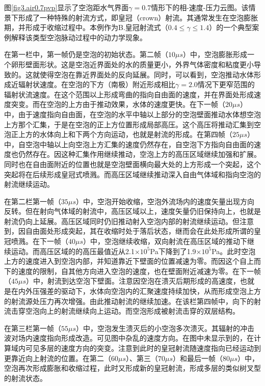 图\ref{fig3.air0.7pvp}显示了空泡距水气界面$\gamma=0.7$情形下的相-速度-压力云图。该情景下形成了一种特殊的射流方式，即皇冠（crown）射流。其通常发生在空泡膨胀期，并形成于收缩过程中。本例作为B.皇冠射流式（$0.4\leq\gamma\leq 1.4$）的一个典型案例解释该类型空泡脉动过程中的动力学现象。

在第一栏中，第一帧仍是空泡的初始状态。第二帧（$10 \mu s$）中，空泡膨胀形成一个卵形壁面形状。这是空泡近界面处的水的质量更小，外界气体密度和粘度更小导致的。这就使得空泡在靠近界面处的反向延展。同时，可以看到，空泡推动水体形成近辐射状速度。在空泡的下方（南极）附近形成相比$\gamma=2.0$情况下更窄范围的辐射状流速度。在这个范围以上形成弯曲的指向自由面的速度，并在界面处形成速度突变。而在空泡的上方由于推动效果，水体的速度更快。在下一帧（$20\mu s$）中，由于速度指向自由面，在空泡的水平中轴以上部分的空泡壁面推动水体想空泡上方那个汇集，于是在空泡的正上方位置形成局部高压。这个高压将推动汇集到空泡正上方的水体向上和下两个方向运动，也就是射流的形成。在第四帧（$25 \mu s$）中，自空泡中轴以上向空泡上方汇集的速度仍然存在，自空泡下方指向自由面的速度也仍然存在。因这种汇集作用继续推动，空泡上方的高压区域继续加强和扩展。同时也在自由面附近的位置也就是空泡壁面横向最大处的上方形成一个突起，这个突起将在后续形成皇冠式喷溅。而高压区域继续推动深入自由气体域和指向空泡的射流继续运动。

在第二栏第一帧（$ 35\mu s$）中，空泡开始收缩，空泡外流场内的速度矢量出现方向反转。但在射向气体域的射流中，高压区域以上，速度矢量仍旧保持向上，也就是射流仍向上延展。高压区域同时仍旧推动射入空泡内部的射流继续运动。但注意到，因自由面处形成突起，其在收缩时处于落后状态，继而会在此处形成所谓的皇冠喷溅。在下一帧（$ 40\mu s$）中，空泡继续收缩，双向射流在高压区域的推动下继续运动。而高压区域的的高压最值近从2.1$\times10^5$Pa下降到了1.9$\times10^5$Pa。此时空泡上方的速度进入到空泡内部，并知道靠近下壁面的位置减速为零。而因这个自上而下的速度的限制，自其他方向进入空泡的速度，也在壁面附近减速为零。在下一帧（$45 \mu s$）中，射流到达空泡下壁面。注意因空泡在溃灭后期形成的高速度，也就是在内外压强差的驱动下，水体向空泡内的汇聚速度持续加快，从而形成空泡上方的射流源处压力再次增强。由此推动射流的继续加速。在该栏第四帧中，向下的射流击穿空泡向上的射流继续向上运动。而空泡形成被射流击穿的双层结构。

在第三栏第一帧（$ 55\mu s$）中，空泡发生溃灭后的小空泡多次溃灭。其辐射的冲击波对场内速度指向形成改造。可见图中杂乱的速度方向。在图中未显示到的，在计算域内可见多层的速度方向的突变。注意到此时的皇冠射流随速度指向已经运动到更靠近向上射流的位置。在第二（$ 60\mu s$）、第三（$ 70\mu s$）和最后一帧（$ 80\mu s$）中，空泡再次形成膨胀和收缩过程，此时又形成新的皇冠射流，形成多层的类似树叉型的射流状态。

